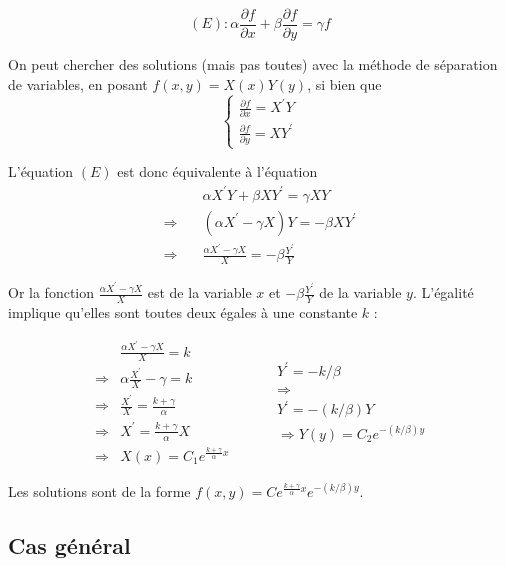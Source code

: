 \documentclass[12pt]{article}
\begin{document}
$$
(E): \alpha \frac{\partial f}{\partial x} + \beta \frac{\partial f}{\partial y} = \gamma f
$$

On peut chercher des solutions (mais pas toutes) avec la méthode de séparation de variables, en posant $f(x, y)=X(x) Y(y)$, si bien que
$$
\left\{\begin{array}{l}
\frac{\partial f}{\partial x} = X^{\prime} Y \\
\frac{\partial f}{\partial y} = X Y^{\prime}
\end{array}\right.
$$

L'équation $(E)$ est donc équivalente à l'équation
$$
\begin{array}{ll} 
& \alpha X^{\prime} Y + \beta X Y^{\prime} = \gamma X Y \\
\Longrightarrow \quad & \left(\alpha X^{\prime} - \gamma X\right) Y = -\beta X Y^{\prime} \\
\Longrightarrow \quad & \frac{\alpha X^{\prime} - \gamma X}{X} = -\beta \frac{Y^{\prime}}{Y}
\end{array}
$$

Or la fonction $\frac{\alpha X^{\prime} - \gamma X}{X}$ est de la variable $x$ et $-\beta \frac{Y^{\prime}}{Y}$ de la variable $y$. L'égalité implique qu'elles sont toutes deux égales à une constante $k$ :

$$
\begin{array}{l|ll} 
& \frac{\alpha X^{\prime} - \gamma X}{X} = k & \\
\Longrightarrow & \alpha \frac{X^{\prime}}{X} - \gamma = k \\
\Longrightarrow & \frac{X^{\prime}}{X} = \frac{k+\gamma}{\alpha} \\
\Longrightarrow & X^{\prime} = \frac{k+\gamma}{\alpha} X \\
\Longrightarrow & X(x) = C_{1} e^{\frac{k+\gamma}{\alpha} x}
\end{array} \quad \begin{aligned}
& Y^{\prime} = -k / \beta \\
& \Longrightarrow \\
& Y^{\prime} = -(k / \beta) Y \\
& \Longrightarrow Y(y) = C_{2} e^{-(k / \beta) y}
\end{aligned}
$$

Les solutions sont de la forme $f(x, y) = C e^{\frac{k+\gamma}{\alpha} x} e^{-(k / \beta) y}$.

\subsection{Cas général}
\end{document}
